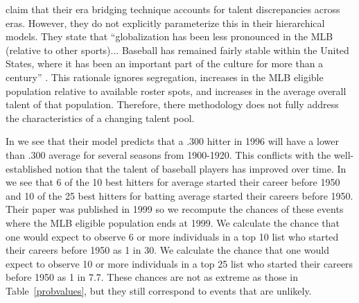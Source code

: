 \documentclass[11pt]{article}\usepackage[]{graphicx}\usepackage[]{color}
\begin{document}
\citet{berry1999eras} claim that their era bridging technique accounts for 
talent discrepancies across eras.  However, they do not explicitly 
parameterize this in their hierarchical models.  They state that 
``globalization has been less pronounced in the MLB (relative to other 
sports)... Baseball has remained fairly stable within the 
United States, where it has been an important part of the culture for more 
than a century'' \citep{berry1999eras}.  This rationale ignores 
segregation, increases in the MLB eligible population 
relative to available roster spots, and increases in the average overall 
talent of that population.  %
Therefore, there methodology does not fully address the characteristics 
of a changing talent pool.  %

In \citet[panel (c) of Figure 7]{berry1999eras} we see that their model 
predicts that a .300 hitter in 1996 will have a lower than .300 average for 
several seasons from 1900-1920.  This conflicts with the well-established 
notion that the talent of baseball players has improved over time.  
In \citet[Table 9]{berry1999eras} we see that 6 of the 10 best hitters 
for average started their career before 1950 and 10 of the 25 best hitters 
for batting average started their careers before 1950.  Their paper was 
published in 1999 so we recompute the chances of these events where the MLB 
eligible population ends at 1999. %
We calculate the chance that one would expect to 
observe 6 or more individuals in a top 10 list who started their careers 
before 1950 as 1 in 30. 
We calculate the chance that one would expect to observe 10 or more 
individuals in a top 25 list who started their careers before 1950 as 
1 in 7.7.  These chances are not as extreme 
as those in Table~\ref{probvalues}, but they still correspond to events 
that are unlikely.  
\end{document}
